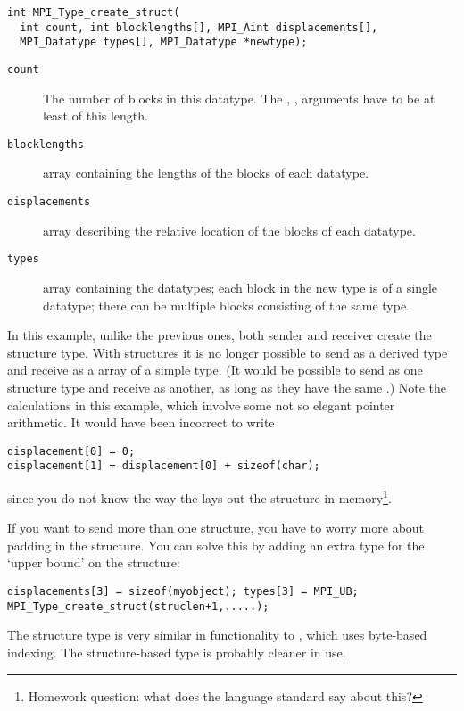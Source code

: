 \begin{verbatim}
int MPI_Type_create_struct(
  int count, int blocklengths[], MPI_Aint displacements[],
  MPI_Datatype types[], MPI_Datatype *newtype);
\end{verbatim}

\begin{description}
\item[\texttt{count}] The number of blocks in this
  datatype. The , , 
  arguments have to be at least of this length.
\item[\texttt{blocklengths}] array containing the lengths of the blocks of each datatype.
\item[\texttt{displacements}] array describing the relative location
  of the blocks of each datatype.
\item[\texttt{types}] array containing the datatypes; each block in
  the new type is of a single datatype; there can be multiple
  blocks consisting of the same type.
\end{description}
In this example, unlike the previous ones, both sender and receiver
create the structure type. With structures it is no longer possible to
send as a derived type and receive as a array of a simple type.
(It would be possible to send as one structure type and receive as another, 
as long as they have the same .)
%
%
Note the  calculations in this example,
which involve some not so elegant pointer arithmetic.
It would have been incorrect to write
\begin{verbatim}
displacement[0] = 0;
displacement[1] = displacement[0] + sizeof(char);
\end{verbatim}
since you do not know the way the  lays out the
structure in memory\footnote{Homework question: what does the language
  standard say about this?}.

If you want to send more than one structure, you have to worry more
about padding in the structure. You can solve this by adding an extra
type  for the `upper bound' on the structure:
\begin{verbatim}
displacements[3] = sizeof(myobject); types[3] = MPI_UB;
MPI_Type_create_struct(struclen+1,.....);
\end{verbatim}

The structure type is very similar in functionality to ,
which uses byte-based indexing. The structure-based type is probably cleaner
in use.

